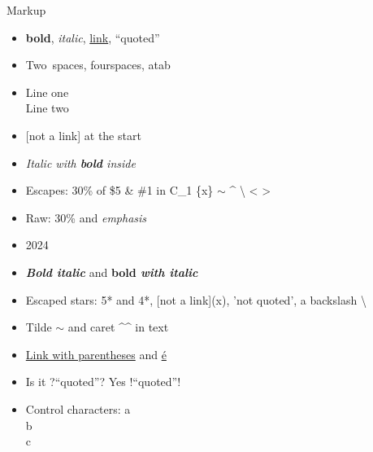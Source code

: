 \documentclass{resume}
\begin{document}
    \begin{rSection}{ Markup }
    \begin{itemize}[leftmargin=*]
    
        
            \item \textbf{bold}, \textit{italic}, \href{https://example.com/a_b\%20c\#frag}{link}, ``quoted''
        
            \item Two\ spaces, four\quad spaces, a\quad tab
        
            \item Line one\\Line two
        
            \item {[}not a link] at the start
        
            \item \textit{Italic with \textbf{bold} inside}
        
            \item Escapes: 30\% of \$5 \& \#1 in C\_1 \{x\} \ensuremath{\sim} \textasciicircum{} \textbackslash{} \textless{} \textgreater{} \textbar{}
        
            \item Raw: 30\% and \emph{emphasis}
        
            \item 2024
        
            \item \textbf{\textit{Bold italic}} and \textbf{bold \textit{with italic}}
        
            \item Escaped stars: 5* and 4*, [not a link](x), 'not quoted', a backslash \textbackslash{}
        
            \item Tilde \ensuremath{\sim} and caret \textasciicircum{}\textasciicircum{} in text
        
            \item \href{https://en.wikipedia.org/wiki/Foo_(bar)}{Link with parentheses} and \href{https://x.org/\%C3\%A9\%5E}{é}
        
            \item Is it ?{}``quoted''? Yes !{}``quoted''!
        
            \item Control characters: a\\b\\c
    \end{itemize}
    \end{rSection}
\end{document}
